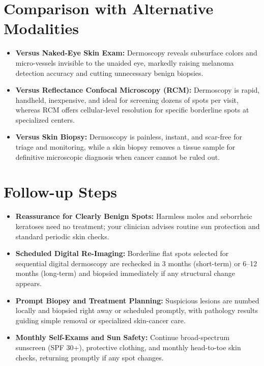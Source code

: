 \section{Comparison with Alternative Modalities}
\begin{itemize}
\item \textbf{Versus Naked-Eye Skin Exam:} Dermoscopy reveals subsurface colors and micro-vessels invisible to the unaided eye, markedly raising melanoma detection accuracy and cutting unnecessary benign biopsies.
\item \textbf{Versus Reflectance Confocal Microscopy (RCM):} Dermoscopy is rapid, handheld, inexpensive, and ideal for screening dozens of spots per visit, whereas RCM offers cellular-level resolution for specific borderline spots at specialized centers.
\item \textbf{Versus Skin Biopsy:} Dermoscopy is painless, instant, and scar-free for triage and monitoring, while a skin biopsy removes a tissue sample for definitive microscopic diagnosis when cancer cannot be ruled out.
\end{itemize}

\section{Follow-up Steps}
\begin{itemize}
\item \textbf{Reassurance for Clearly Benign Spots:} Harmless moles and seborrheic keratoses need no treatment; your clinician advises routine sun protection and standard periodic skin checks.
\item \textbf{Scheduled Digital Re-Imaging:} Borderline flat spots selected for sequential digital dermoscopy are rechecked in 3 months (short-term) or 6--12 months (long-term) and biopsied immediately if any structural change appears.
\item \textbf{Prompt Biopsy and Treatment Planning:} Suspicious lesions are numbed locally and biopsied right away or scheduled promptly, with pathology results guiding simple removal or specialized skin-cancer care.
\item \textbf{Monthly Self-Exams and Sun Safety:} Continue broad-spectrum sunscreen (SPF 30+), protective clothing, and monthly head-to-toe skin checks, returning promptly if any spot changes.
\end{itemize}

